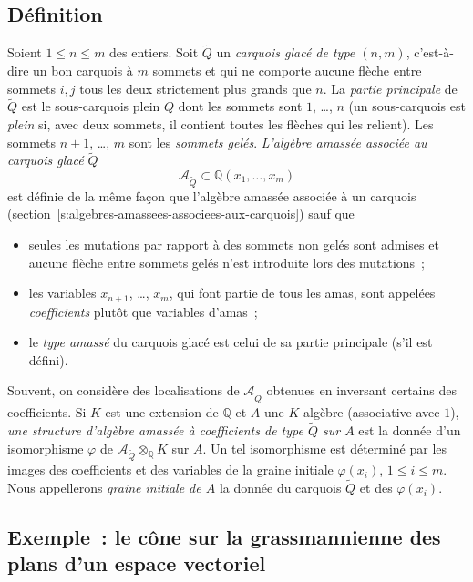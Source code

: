 \documentclass[brochure,12pt]{bourbaki}
\numberwithin{equation}{subsection}
\numberwithin{theorem}{section}
\newcommand{\Q}{\mathbb{Q}}
\newcommand{\ten}{\otimes}
\newcommand{\ca}{{\mathcal A}}
\renewcommand{\phi}{\varphi}
\renewcommand{\tilde}[1]{\widetilde{#1}}
\begin{document}
\subsection{D\'efinition} \label{ss:def-cluster-alg-coeff}
Soient $1 \leq n \leq m$ des entiers. Soit $\tilde{Q}$ un
{\em carquois glac\'e de type $(n,m)$}, c'est-\`a-dire
un bon carquois \`a $m$ sommets
et qui ne comporte aucune fl\`eche entre sommets $i,j$
tous les deux strictement plus grands que $n$.
La {\em partie principale} de $\tilde{Q}$ est le sous-carquois
plein $Q$ dont les sommets sont $1$, \ldots, $n$ (un sous-carquois
est {\em plein} si, avec deux sommets, il contient toutes
les fl\`eches qui les relient). Les sommets $n+1$, \ldots, $m$
sont les {\em sommets gel\'es}.
{\em L'alg\`ebre amass\'ee associ\'ee au carquois glac\'e $\tilde{Q}$}
\[
\ca_{\tilde{Q}} \subset \Q(x_1, \ldots, x_m)
\]
est d\'efinie de la m\^eme fa\c{c}on que l'alg\`ebre amass\'ee
associ\'ee \`a un carquois
(section~\ref{s:algebres-amassees-associees-aux-carquois})
sauf que
\begin{itemize}
\item seules les mutations par rapport \`a des sommets non gel\'es
sont admises et aucune fl\`eche entre sommets gel\'es
n'est introduite lors des mutations~;
\item les variables $x_{n+1}$, \ldots, $x_m$, qui font partie
de tous les amas, sont appel\'ees {\em coefficients} plut\^ot
que variables d'amas~;
\item le {\em type amass\'e} du carquois glac\'e est celui
de sa partie principale (s'il est d\'efini).
\end{itemize}
Souvent, on consid\`ere des localisations de $\ca_{\tilde{Q}}$
obtenues en inversant certains des coef\-ficients.
Si $K$ est une
extension de $\Q$ et $A$ une $K$-alg\`ebre (associative avec $1$),
{\em une structure d'alg\`ebre amass\'ee \`a coefficients de type
  $\tilde{Q}$ sur $A$} est la donn\'ee d'un isomorphisme $\phi$
de $\ca_{\tilde{Q}} \ten_\Q K$ sur $A$. Un tel isomorphisme
est d\'etermin\'e par les images des coefficients et des
variables de la graine initiale $\phi(x_i)$, $1 \leq i\leq m$. Nous appellerons
{\em graine initiale de $A$} la donn\'ee du carquois
$\tilde{Q}$ et des $\phi(x_i)$.


\subsection{Exemple~: le c\^one sur la grassmannienne des plans d'un espace vectoriel}
\end{document}
